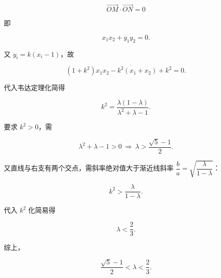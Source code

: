 \begin{answer}
\nopagebreak[4]
\[\overrightarrow{OM}\cdot\overrightarrow{ON}=0\]

即

\nopagebreak[4]
\[x_1x_2+y_1y_2=0.\]

又 $y_i=k(x_i-1)$，故

\nopagebreak[4]
\[(1+k^2)x_1x_2-k^2(x_1+x_2)+k^2=0.\]

代入韦达定理化简得

\nopagebreak[4]
\[k^2=\frac{\lambda(1-\lambda)}{\lambda^2+\lambda-1}.\]

要求 $k^2>0$，需

\nopagebreak[4]
\[\lambda^2+\lambda-1>0\ \Rightarrow\ \lambda>\frac{\sqrt5-1}{2}.\]

又直线与右支有两个交点，需斜率绝对值大于渐近线斜率 $\dfrac{b}{a}=\sqrt{\dfrac{\lambda}{1-\lambda}}$：

\nopagebreak[4]
\[k^2>\frac{\lambda}{1-\lambda}.\]

代入 $k^2$ 化简易得

\nopagebreak[4]
\[\lambda<\frac23.\]

综上，

\nopagebreak[4]
\[\frac{\sqrt5-1}{2}<\lambda<\frac23.\]


\end{answer}